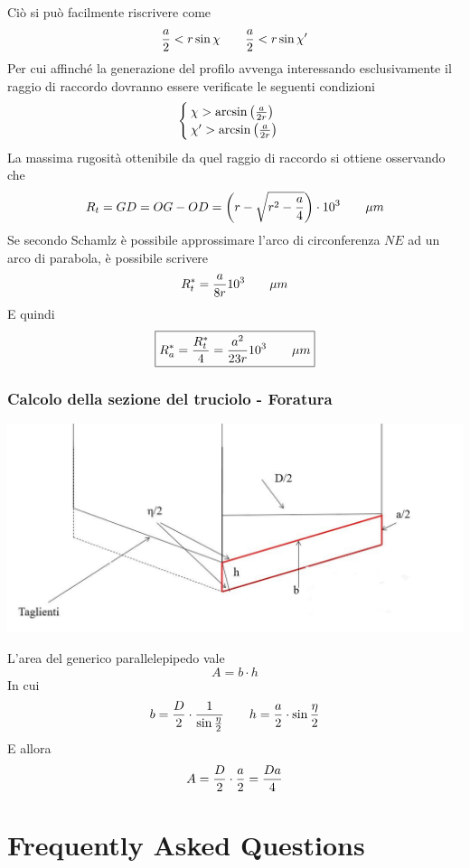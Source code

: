\documentclass[a4paper, 15pt]{article}
\begin{document}
	Ciò si può facilmente riscrivere come 
	\[{a\over2}<r\sin\chi\qquad{a\over2}<r\sin\chi'\]
	Per cui affinché la generazione del profilo avvenga interessando esclusivamente il
	raggio di raccordo dovranno essere verificate le seguenti condizioni
	\[\begin{cases}
		\chi>\arcsin\left(a\over2r\right)\\
		\chi'>\arcsin\left(a\over2r\right)
	\end{cases}\]
	\newpage
	La massima rugosità ottenibile da quel raggio di raccordo si ottiene osservando che
	\[R_t = GD = OG - OD = \left(r-\sqrt{r^2-{a\over4}}\right)\cdot10^3\qquad\mu m\]
	Se secondo Schamlz è possibile approssimare l'arco di circonferenza $NE$ ad un arco di parabola, è possibile scrivere 
	\[R_t^* = {a\over8r}10^3\qquad\mu m\]
	E quindi 
	\begin{equation}\label{eq:23}
		\boxed{R_a^* = {R_t^*\over4} = {a^2\over23r}10^3\qquad\mu m}
	\end{equation}
	 \section{Calcolo della sezione del truciolo - Foratura}
\begin{center}
	\includegraphics[width=0.7\linewidth]{figures/asp18}
\end{center}
	L'area del generico parallelepipedo vale 
	\[A = b\cdot h\]
	In cui
	\[b = {D\over2}\cdot\dfrac{1}{\sin{\eta\over2}}\qquad h = {a\over2}\cdot\sin{\eta\over2}\]
	E allora 
	\[A = {D\over2}\cdot{a\over2} = \dfrac{Da}{4} \]
	
	
\newpage	
	
	
\part{Frequently Asked Questions}
\end{document}
